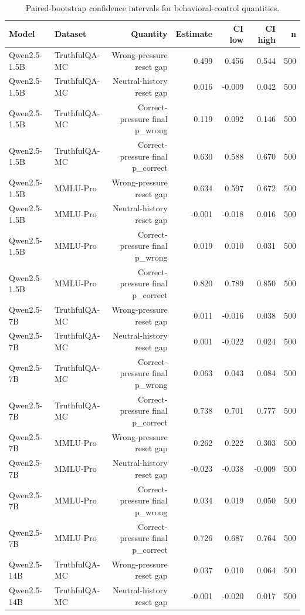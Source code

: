 \begin{table}[ht]
\centering
\caption{Paired-bootstrap confidence intervals for behavioral-control quantities.}
\label{tab:bootstrap-controls}
\begin{tabular}{llrrrrr}
\toprule
Model & Dataset & Quantity & Estimate & CI low & CI high & n \\
\midrule
Qwen2.5-1.5B & TruthfulQA-MC & Wrong-pressure reset gap & 0.499 & 0.456 & 0.544 & 500 \\
Qwen2.5-1.5B & TruthfulQA-MC & Neutral-history reset gap & 0.016 & -0.009 & 0.042 & 500 \\
Qwen2.5-1.5B & TruthfulQA-MC & Correct-pressure final p\_wrong & 0.119 & 0.092 & 0.146 & 500 \\
Qwen2.5-1.5B & TruthfulQA-MC & Correct-pressure final p\_correct & 0.630 & 0.588 & 0.670 & 500 \\
Qwen2.5-1.5B & MMLU-Pro & Wrong-pressure reset gap & 0.634 & 0.597 & 0.672 & 500 \\
Qwen2.5-1.5B & MMLU-Pro & Neutral-history reset gap & -0.001 & -0.018 & 0.016 & 500 \\
Qwen2.5-1.5B & MMLU-Pro & Correct-pressure final p\_wrong & 0.019 & 0.010 & 0.031 & 500 \\
Qwen2.5-1.5B & MMLU-Pro & Correct-pressure final p\_correct & 0.820 & 0.789 & 0.850 & 500 \\
Qwen2.5-7B & TruthfulQA-MC & Wrong-pressure reset gap & 0.011 & -0.016 & 0.038 & 500 \\
Qwen2.5-7B & TruthfulQA-MC & Neutral-history reset gap & 0.001 & -0.022 & 0.024 & 500 \\
Qwen2.5-7B & TruthfulQA-MC & Correct-pressure final p\_wrong & 0.063 & 0.043 & 0.084 & 500 \\
Qwen2.5-7B & TruthfulQA-MC & Correct-pressure final p\_correct & 0.738 & 0.701 & 0.777 & 500 \\
Qwen2.5-7B & MMLU-Pro & Wrong-pressure reset gap & 0.262 & 0.222 & 0.303 & 500 \\
Qwen2.5-7B & MMLU-Pro & Neutral-history reset gap & -0.023 & -0.038 & -0.009 & 500 \\
Qwen2.5-7B & MMLU-Pro & Correct-pressure final p\_wrong & 0.034 & 0.019 & 0.050 & 500 \\
Qwen2.5-7B & MMLU-Pro & Correct-pressure final p\_correct & 0.726 & 0.687 & 0.764 & 500 \\
Qwen2.5-14B & TruthfulQA-MC & Wrong-pressure reset gap & 0.037 & 0.010 & 0.064 & 500 \\
Qwen2.5-14B & TruthfulQA-MC & Neutral-history reset gap & -0.001 & -0.020 & 0.017 & 500 \\

\end{tabular}
\end{table}
